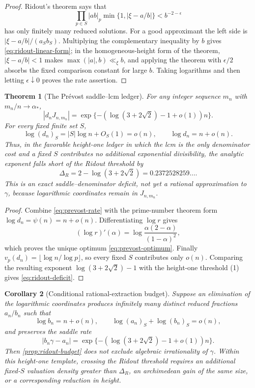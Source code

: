 \documentclass[11pt]{article}
\newtheorem{theorem}{Theorem}[section]
\newtheorem{corollary}[theorem]{Corollary}
\theoremstyle{definition}
\theoremstyle{remark}
\begin{document}
\begin{proof}
Ridout's theorem \cite{Ridout1958} says that
\[
 \prod_{p\in S}|ab|_p
 \min\{1,|\xi-a/b|\}<b^{-2-\epsilon}
\]
has only finitely many reduced solutions.  For a good approximant the left
side is \(|\xi-a/b|/(a_Sb_S)\).  Multiplying the complementary inequality
by \(b\) gives \eqref{eq:ridout-linear-form}; in the homogeneous-height
form of the theorem, \(|\xi-a/b|<1\) makes
\(\max(|a|,b)\ll_\xi b\), and applying the theorem with
\(\epsilon/2\) absorbs the fixed comparison constant for large \(b\).
Taking logarithms and then letting \(\epsilon\downarrow0\) proves the rate
assertion.
\end{proof}

\begin{theorem}[The Pr\'evost saddle--lcm ledger]
\label{thm:prevost-ridout-deficit}
For any integer sequence \(m_n\) with \(m_n/n\to\alpha_*\),
\[
 |d_nJ_{n,m_n}|=
 \exp\{-(\log(3+2\sqrt2)-1+o(1))n\}.
\]
For every fixed finite set \(S\),
\[
 \log(d_n)_S=|S|\log n+O_S(1)=o(n),
 \qquad
 \log d_n=n+o(n).
\]
Thus, in the favorable height-one ledger in which the lcm is the only
denominator cost and a fixed \(S\) contributes no additional exponential
divisibility, the analytic exponent falls short of the Ridout threshold by
\begin{equation}\label{eq:ridout-deficit}
 \boxed{\displaystyle
 \Delta_R=2-\log(3+2\sqrt2)
 =0.2372528259\ldots.}
\end{equation}
This is an exact saddle--denominator deficit, not yet a rational
approximation to \(\gamma\), because logarithmic coordinates remain in
\(J_{n,m_n}\).
\end{theorem}

\begin{proof}
Combine \eqref{eq:prevost-rate} with the prime-number theorem form
\(\log d_n=\psi(n)=n+o(n)\).  Differentiating \(\log r\) gives
\[
 (\log r)'(\alpha)
 =\log\frac{\alpha(2-\alpha)}{(1-\alpha)^2},
\]
which proves the unique optimum \eqref{eq:prevost-optimum}.  Finally
\(v_p(d_n)=\lfloor\log n/\log p\rfloor\), so every fixed \(S\) contributes
only \(o(n)\).  Comparing the resulting exponent
\(\log(3+2\sqrt2)-1\) with the height-one threshold (1) gives
\eqref{eq:ridout-deficit}.
\end{proof}

\begin{corollary}[Conditional rational-extraction budget]
Suppose an elimination of the logarithmic coordinates produces infinitely
many distinct reduced fractions \(a_n/b_n\) such that
\[
 \log b_n=n+o(n),\qquad
 \log(a_n)_S+\log(b_n)_S=o(n),
\]
and preserves the saddle rate
\[
 |b_n\gamma-a_n|
 =\exp\{-(\log(3+2\sqrt2)-1+o(1))n\}.
\]
Then \cref{prop:ridout-budget} does not exclude algebraic irrationality of
\(\gamma\).  Within this height-one template, crossing the Ridout threshold
requires an additional fixed-\(S\) valuation density greater than
\(\Delta_R\), an archimedean gain of the same size, or a corresponding
reduction in height.
\end{corollary}
\end{document}
